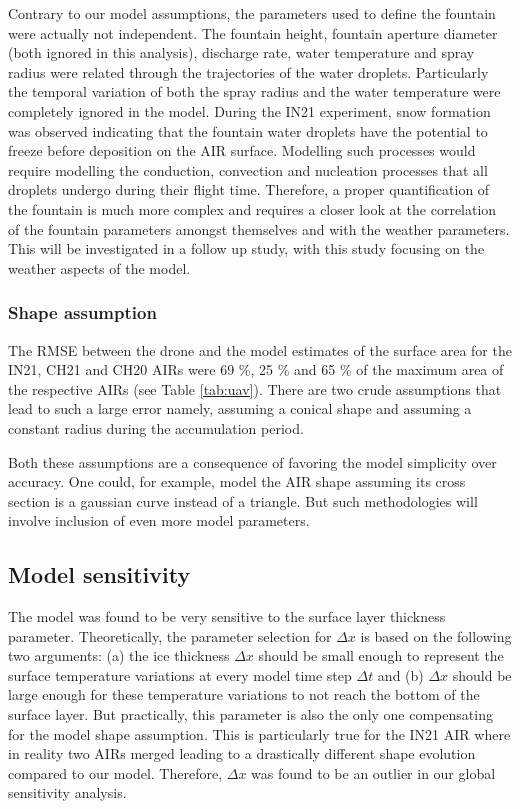 \documentclass[utf8]{frontiersSCNS}
\begin{document}
Contrary to our model assumptions, the parameters used to define the fountain were actually not independent. The
fountain height, fountain aperture diameter (both ignored in this analysis), discharge rate, water temperature
and spray radius were related through the trajectories of the water droplets. Particularly the temporal
variation of both the spray radius and the water temperature were completely ignored in the model. During the
IN21 experiment, snow formation was observed indicating that the fountain water droplets have the potential to
freeze before deposition on the AIR surface. Modelling such processes would require modelling the conduction,
convection and nucleation processes that all droplets undergo during their flight time. Therefore, a proper
quantification of the fountain is much more complex and requires a closer look at the correlation of the
fountain parameters amongst themselves and with the weather parameters. This will be investigated in a follow up
study, with this study focusing on the weather aspects of the model.

\subsubsection{Shape assumption}

The RMSE between the drone and the model estimates of the surface area for the IN21, CH21 and CH20 AIRs were 69
\%, 25 \% and 65 \% of the maximum area of the respective AIRs (see Table \ref{tab:uav}). There are two crude
assumptions that lead to such a large error namely, assuming a conical shape and assuming a constant radius
during the accumulation period.

Both these assumptions are a consequence of favoring the model simplicity over accuracy. One could, for example,
model the AIR shape assuming its cross section is a gaussian curve instead of a triangle.  But such
methodologies will involve inclusion of even more model parameters.

\subsection{Model sensitivity}

The model was found to be very sensitive to the surface layer thickness parameter. Theoretically, the parameter
selection for $\Delta x$ is based on the following two arguments: (a) the ice thickness $\Delta x$ should be
small enough to represent the surface temperature variations at every model time step $\Delta t$ and (b) $\Delta x$
should be large enough for these temperature variations to not reach the bottom of the surface layer. But
practically, this parameter is also the only one compensating for the model shape assumption. This is
particularly true for the IN21 AIR where in reality two AIRs merged leading to a drastically different shape
evolution compared to our model. Therefore, $\Delta x$ was found to be an outlier in our global sensitivity
analysis. 
\end{document}
